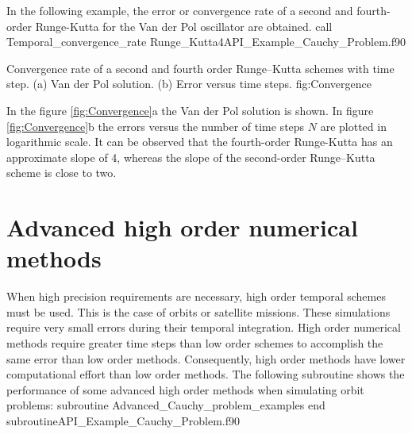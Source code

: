      In the following example, the error or convergence rate  of a second and fourth-order  Runge-Kutta for the Van der Pol oscillator are obtained. 
       \vspace{0.5cm} 
        {call Temporal_convergence_rate}
        {Runge_Kutta4}{API_Example_Cauchy_Problem.f90}
       
        \twographs{}
                  {}
                  {Convergence rate of a second and fourth order Runge--Kutta schemes with time step.
                     (a) Van der Pol solution.
                     (b) Error versus time steps. }
                     {fig:Convergence}   
     
      In the figure \ref{fig:Convergence}a the Van der Pol solution is shown. 
      In figure \ref{fig:Convergence}b the errors versus the number of time steps $ N $ are plotted in logarithmic scale.  
      It can be observed that the fourth-order Runge-Kutta has an approximate slope of 4, whereas the slope of the second-order Runge--Kutta scheme is close to two.    
   
   
  
 \newpage                            
 \section{Advanced high order numerical methods}
 When high precision requirements are necessary, high order temporal schemes must be used. 
 This is the case of orbits or satellite missions. 
 These simulations require very small errors during their temporal integration. 
 High order numerical methods require greater time steps than low order schemes to accomplish the same error 
 than low order methods. 
 Consequently, high order methods have lower computational effort than low order methods. 
 The following subroutine shows the performance of  some advanced high order methods when simulating orbit problems:
        {subroutine Advanced_Cauchy_problem_examples}
        {end subroutine}{API_Example_Cauchy_Problem.f90}
 
